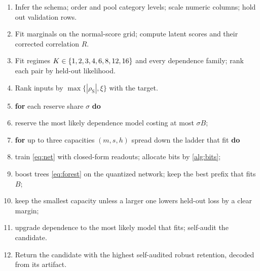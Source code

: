 \begin{algo}[t]
\caption{\textsc{Compile}$(D_{\mathrm{fit}}, B)$: target-first program search within $B$ bytes.}
\label{alg:compile}
\small
\begin{enumerate}[leftmargin=2em,itemsep=1pt,topsep=3pt,label=\arabic*:]
\item Infer the schema; order and pool category levels; scale numeric columns; hold out validation rows.
\item Fit marginals on the normal-score grid; compute latent scores and their corrected correlation $R$.
\item Fit regimes $K\in\{1,2,3,4,6,8,12,16\}$ and every dependence family; rank each pair by held-out likelihood.
\item Rank inputs by $\max\{|\rho_{\mathrm{S}}|,\xi\}$ with the target.
\item \textbf{for} each reserve share $\sigma$ \textbf{do}
\item \hspace{1.2em}reserve the most likely dependence model costing at most $\sigma B$;
\item \hspace{1.2em}\textbf{for} up to three capacities $(m,s,h)$ spread down the ladder that fit \textbf{do}
\item \hspace{2.4em}train \eqref{eq:net} with closed-form readouts; allocate bits by \cref{alg:bits};
\item \hspace{2.4em}boost trees \eqref{eq:forest} on the quantized network; keep the best prefix that fits $B$;
\item \hspace{1.2em}keep the smallest capacity unless a larger one lowers held-out loss by a clear margin;
\item \hspace{1.2em}upgrade dependence to the most likely model that fits; self-audit the candidate.
\item Return the candidate with the highest self-audited robust retention, decoded from its artifact.
\end{enumerate}
\end{algo}

